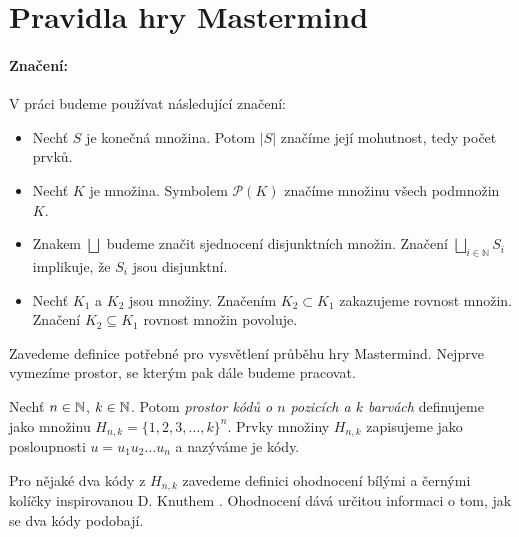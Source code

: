\chapter{Pravidla hry Mastermind}

\subsubsection{Značení:}
V práci budeme používat následující značení:
\begin{itemize}
    \item Nechť $S$ je konečná množina. Potom $|S|$ značíme její mohutnost, tedy počet prvků.
    \item Nechť $K$ je množina. Symbolem $\mathcal{P}(K)$ značíme množinu všech podmnožin $K$.
    \item Znakem $\bigsqcup$ budeme značit sjednocení disjunktních množin. Značení $\bigsqcup_{i\in \mathbb{N}} S_i$ implikuje, že $S_i$ jsou disjunktní. 
    \item Nechť $K_1$ a $K_2$ jsou množiny. Značením $K_2 \subset K_1$ zakazujeme rovnost množin. Značení $K_2 \subseteq K_1$ rovnost množin povoluje.
\end{itemize}

Zavedeme definice potřebné pro vysvětlení průběhu hry Mastermind. Nejprve vymezíme prostor, se kterým pak dále budeme pracovat. 

\begin{definice}\label{def01:1}
  Nechť $n \in \mathbb{N} $, $k \in \mathbb{N} $. Potom \emph{prostor kódů o $n$ pozicích a $k$ barvách} definujeme jako množinu $H_{n,k} = \{1, 2, 3, \dots, k\}^n$. Prvky množiny $H_{n,k}$ zapisujeme jako posloupnosti $u = u_1u_2\dots u_n$ a nazýváme je kódy.
\end{definice}


Pro nějaké dva kódy z $H_{n,k}$ zavedeme definici ohodnocení bílými a černými kolíčky inspirovanou D. Knuthem \cite{donald_e__knuth_1977}. Ohodnocení dává určitou informaci o tom, jak se dva kódy podobají.


